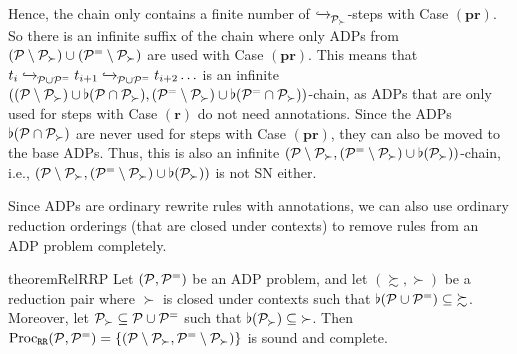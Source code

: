 \begin{myproof}
    Hence, the chain only contains a finite number of $\mathrel{ \xhookrightarrow{{}_{\scriptstyle }} \!\!{}^{}_{\mathcal{P}_{\succ}} }$-steps with
    Case $(\mathbf{pr})$. So there is an infinite suffix of the chain where only
    ADPs from $(\mathcal{P} \setminus \mathcal{P}_{\succ}) \cup (\mathcal{P}^{=} \setminus \mathcal{P}_{\succ})$ are
    used with
    Case $(\mathbf{pr})$.
    This means that $t_i \mathrel{ \xhookrightarrow{{}_{\scriptstyle }} \!\!{}^{}_{\mathcal{P} \cup \mathcal{P}^{=}} } t_{i+1} \mathrel{ \xhookrightarrow{{}_{\scriptstyle }} \!\!{}^{}_{\mathcal{P} \cup
      \mathcal{P}^{=}} } t_{i+2} \ldots$ is an infinite $((\mathcal{P} \setminus \mathcal{P}_{\succ}) \cup
        \flat(\mathcal{P} \cap \mathcal{P}_{\succ}), (\mathcal{P}^{=} \setminus \mathcal{P}_{\succ}) \cup
        \flat(\mathcal{P}^{=} \cap \mathcal{P}_{\succ}))$-chain, as ADPs that are only used for steps
        with Case $(\mathbf{r})$ do not need annotations.
Since the ADPs  $\flat(\mathcal{P} \cap \mathcal{P}_{\succ})$ are never used for steps with 
Case $(\mathbf{pr})$, they can also be moved to the base ADPs. Thus, this is also an
infinite $(\mathcal{P} \setminus \mathcal{P}_{\succ}, (\mathcal{P}^{=} \setminus \mathcal{P}_{\succ}) \cup
        \flat(\mathcal{P}_{\succ}))$-chain, i.e., 
$(\mathcal{P} \setminus \mathcal{P}_{\succ}, (\mathcal{P}^{=} \setminus \mathcal{P}_{\succ}) \cup
        \flat(\mathcal{P}_{\succ}))$ is not SN either.
\end{myproof}


Since ADPs are ordinary rewrite rules with annotations, we can also use
ordinary reduction orderings (that are closed under contexts)
to remove rules from an ADP problem completely.

\begin{restatable}{theorem}{RelRRP}\label{thm:RelRRP}
    Let $(\mathcal{P},\mathcal{P}^{=})$ be an ADP problem, and let
    $(\succsim, \succ)$ be a
 reduction pair where $\succ$ is closed under contexts
    such that $\flat(\mathcal{P} \cup \mathcal{P}^{=}) \subseteq {\succsim}$.
  Moreover, let $\mathcal{P}_{\succ} \subseteq \mathcal{P} \cup \mathcal{P}^{=}$ 
  such that $\flat(\mathcal{P}_{\succ}) \subseteq {\succ}$.
Then
    $\operatorname{Proc}_{\mathtt{RR}}(\mathcal{P},\mathcal{P}^{=}) = \{(\mathcal{P} \setminus \mathcal{P}_{\succ}, \mathcal{P}^{=} \setminus \mathcal{P}_{\succ})\}$
 is sound and complete.
\end{restatable}

